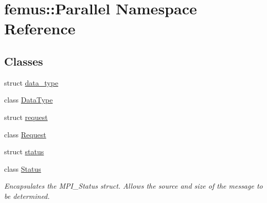 \hypertarget{namespacefemus_1_1_parallel}{}\section{femus\+:\+:Parallel Namespace Reference}
\label{namespacefemus_1_1_parallel}
\subsection*{Classes}
\begin{DoxyCompactItemize}
\item 
struct \mbox{\hyperlink{structfemus_1_1_parallel_1_1data__type}{data\+\_\+type}}
\item 
class \mbox{\hyperlink{classfemus_1_1_parallel_1_1_data_type}{Data\+Type}}
\item 
struct \mbox{\hyperlink{structfemus_1_1_parallel_1_1request}{request}}
\item 
class \mbox{\hyperlink{classfemus_1_1_parallel_1_1_request}{Request}}
\item 
struct \mbox{\hyperlink{structfemus_1_1_parallel_1_1status}{status}}
\item 
class \mbox{\hyperlink{classfemus_1_1_parallel_1_1_status}{Status}}
\begin{DoxyCompactList}\small\item\em Encapsulates the M\+P\+I\+\_\+\+Status struct. Allows the source and size of the message to be determined. \end{DoxyCompactList}\end{DoxyCompactItemize}
